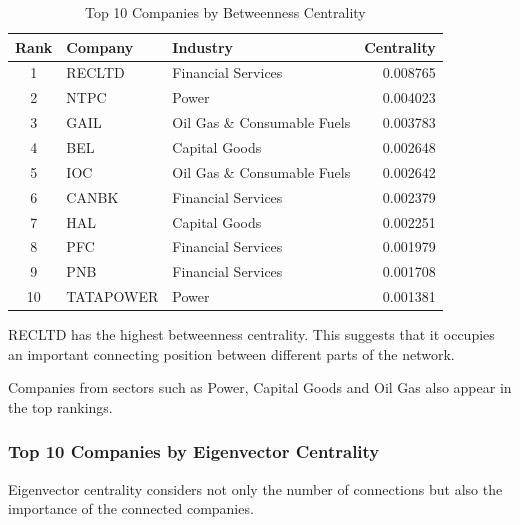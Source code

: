 \documentclass[11pt,a4paper]{article}
\begin{document}
\begin{table}[H]
\centering
\caption{Top 10 Companies by Betweenness Centrality}
\label{tab:betweenness}
\small
\begin{tabular}{cllr}
\toprule
\textbf{Rank} & \textbf{Company} & \textbf{Industry} &
\textbf{Centrality}\\
\midrule
1 & RECLTD & Financial Services & 0.008765\\
2 & NTPC & Power & 0.004023\\
3 & GAIL & Oil Gas \& Consumable Fuels & 0.003783\\
4 & BEL & Capital Goods & 0.002648\\
5 & IOC & Oil Gas \& Consumable Fuels & 0.002642\\
6 & CANBK & Financial Services & 0.002379\\
7 & HAL & Capital Goods & 0.002251\\
8 & PFC & Financial Services & 0.001979\\
9 & PNB & Financial Services & 0.001708\\
10 & TATAPOWER & Power & 0.001381\\
\bottomrule
\end{tabular}
\end{table}

RECLTD has the highest betweenness centrality.
This suggests that it occupies an important connecting
position between different parts of the network.

Companies from sectors such as Power, Capital Goods
and Oil Gas also appear in the top rankings.

\subsubsection{Top 10 Companies by Eigenvector Centrality}

Eigenvector centrality considers not only the number
of connections but also the importance of the connected
companies.
\end{document}
